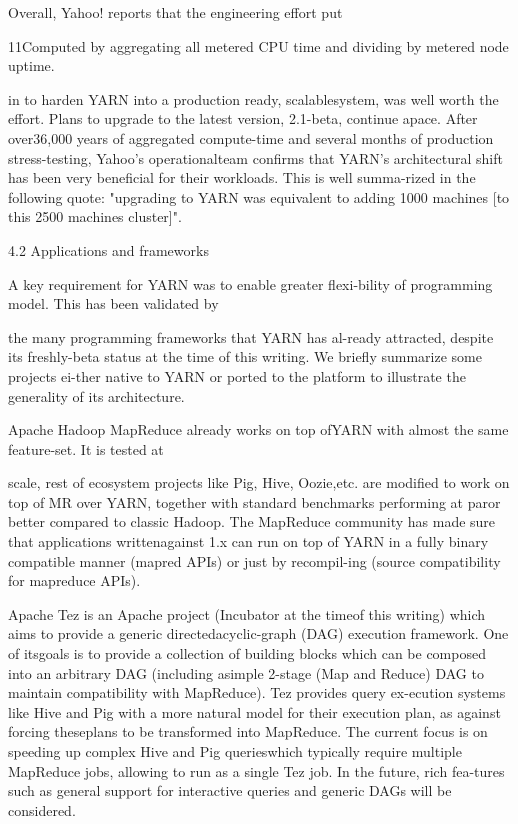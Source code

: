 Overall, Yahoo! reports that the engineering effort put

11Computed by aggregating all metered CPU time and dividing by
metered node uptime.

in to harden YARN into a production ready, scalablesystem, was well worth the effort. Plans to upgrade to
the latest version, 2.1-beta, continue apace. After over36,000 years of aggregated compute-time and several
months of production stress-testing, Yahoo's operationalteam confirms that YARN's architectural shift has been
very beneficial for their workloads. This is well summa-rized in the following quote: "upgrading to YARN was
equivalent to adding 1000 machines [to this 2500 machines cluster]".

4.2 Applications and frameworks

A key requirement for YARN was to enable greater flexi-bility of programming model. This has been validated by

the many programming frameworks that YARN has al-ready attracted, despite its freshly-beta status at the time
of this writing. We briefly summarize some projects ei-ther native to YARN or ported to the platform to illustrate the generality of its architecture.

Apache Hadoop MapReduce already works on top ofYARN with almost the same feature-set. It is tested at

scale, rest of ecosystem projects like Pig, Hive, Oozie,etc. are modified to work on top of MR over YARN,
together with standard benchmarks performing at paror better compared to classic Hadoop. The MapReduce community has made sure that applications writtenagainst 1.x can run on top of YARN in a fully binary
compatible manner (mapred APIs) or just by recompil-ing (source compatibility for mapreduce APIs).

Apache Tez is an Apache project (Incubator at the timeof this writing) which aims to provide a generic directedacyclic-graph (DAG) execution framework. One of itsgoals is to provide a collection of building blocks which
can be composed into an arbitrary DAG (including asimple 2-stage (Map and Reduce) DAG to maintain
compatibility with MapReduce). Tez provides query ex-ecution systems like Hive and Pig with a more natural
model for their execution plan, as against forcing theseplans to be transformed into MapReduce. The current
focus is on speeding up complex Hive and Pig querieswhich typically require multiple MapReduce jobs, allowing to run as a single Tez job. In the future, rich fea-tures such as general support for interactive queries and
generic DAGs will be considered.


